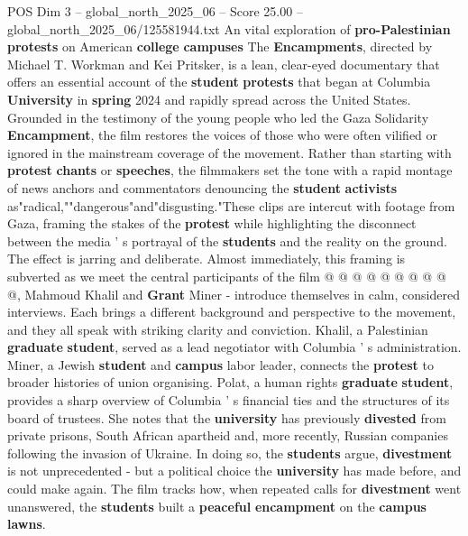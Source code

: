 \begin{textsample}{POS Dim 3 – global\_north\_2025\_06 – Score 25.00 – global\_north\_2025\_06/125581944.txt}  \label{ex:f3_pos_102}
An vital exploration of \textbf{pro-Palestinian} \textbf{protests} on American \textbf{college} \textbf{campuses} The \textbf{Encampments}, directed by Michael T.
Workman and Kei Pritsker, is a lean, clear-eyed documentary that offers an essential account of the \textbf{student} \textbf{protests} that began at Columbia \textbf{University} in \textbf{spring} 2024 and rapidly spread across the United States.
Grounded in the testimony of the young people who led the Gaza Solidarity \textbf{Encampment}, the film restores the voices of those who were often vilified or ignored in the mainstream coverage of the movement.
Rather than starting with \textbf{protest} \textbf{chants} or \textbf{speeches}, the filmmakers set the tone with a rapid montage of news anchors and commentators denouncing the \textbf{student} \textbf{activists} as"radical,""dangerous"and"disgusting."These clips are intercut with footage from Gaza, framing the stakes of the \textbf{protest} while highlighting the disconnect between the media ' s portrayal of the \textbf{students} and the reality on the ground.
The effect is jarring and deliberate.
Almost immediately, this framing is subverted as we meet the central participants of the film @ @ @ @ @ @ @ @ @ @, Mahmoud Khalil and \textbf{Grant} Miner - introduce themselves in calm, considered interviews.
Each brings a different background and perspective to the movement, and they all speak with striking clarity and conviction.
Khalil, a Palestinian \textbf{graduate} \textbf{student}, served as a lead negotiator with Columbia ' s administration.
Miner, a Jewish \textbf{student} and \textbf{campus} labor leader, connects the \textbf{protest} to broader histories of union organising.
Polat, a human rights \textbf{graduate} \textbf{student}, provides a sharp overview of Columbia ' s financial ties and the structures of its board of trustees.
She notes that the \textbf{university} has previously \textbf{divested} from private prisons, South African apartheid and, more recently, Russian companies following the invasion of Ukraine.
In doing so, the \textbf{students} argue, \textbf{divestment} is not unprecedented - but a political choice the \textbf{university} has made before, and could make again.
The film tracks how, when repeated calls for \textbf{divestment} went unanswered, the \textbf{students} built a \textbf{peaceful} \textbf{encampment} on the \textbf{campus} \textbf{lawns}.

\end{textsample}
